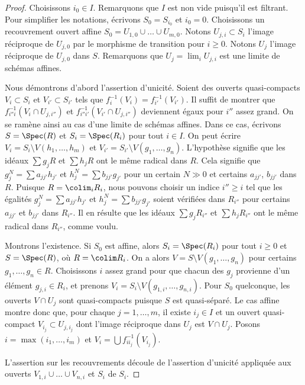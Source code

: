 \begin{proof}
Choisissons $i_0 \in I$. Remarquons que $I$ est non vide puisqu'il est
filtrant. Pour simplifier les notations, écrivons $S_0 = S_{i_0}$ et
$i_0 = 0$. Choisissons un recouvrement ouvert affine
$S_0 = U_{1, 0} \cup \ldots \cup U_{m, 0}$. Notons
$U_{j, i} \subset S_i$ l'image réciproque de $U_{j, 0}$ par le morphisme de
transition pour $i \geq 0$. Notons $U_j$ l'image réciproque de $U_{j, 0}$ dans $S$.
Remarquons que $U_j = \lim_i U_{j, i}$ est une limite de schémas affines.

\medskip\noindent
Nous démontrons d'abord l'assertion d'unicité. Soient des ouverts
quasi-compacts $V_i \subset S_i$ et $V_{i'} \subset S_{i'}$ tels que
$f_i^{-1}(V_i) = f_{i'}^{-1}(V_{i'})$. Il suffit de montrer que
$f_{i''i}^{-1}(V_i \cap U_{j, i''})$ et
$f_{i''i'}^{-1}(V_{i'} \cap U_{j, i''})$ deviennent égaux pour $i''$ assez
grand. On se ramène ainsi au cas d'une limite de schémas affines. Dans ce
cas, écrivons $S = \Spec(R)$ et $S_i = \Spec(R_i)$ pour tout $i \in I$.
On peut écrire $V_i = S_i \setminus V(h_1, \ldots, h_m)$ et
$V_{i'} = S_{i'} \setminus V(g_1, \ldots, g_n)$. L'hypothèse signifie que
les idéaux $\sum g_jR$ et $\sum h_jR$ ont le même radical dans $R$.
Cela signifie que $g_j^N = \sum a_{jj'}h_{j'}$ et
$h_j^N = \sum b_{jj'} g_{j'}$ pour un certain $N \gg 0$ et certains
$a_{jj'}$, $b_{jj'}$ dans $R$. Puisque $R = \colim_i R_i$, nous pouvons
choisir un indice $i'' \geq i$ tel que les égalités
$g_j^N = \sum a_{jj'}h_{j'}$ et
$h_j^N = \sum b_{jj'} g_{j'}$ soient vérifiées dans $R_{i''}$ pour certains
$a_{jj'}$ et $b_{jj'}$ dans $R_{i''}$. Il en résulte que les idéaux
$\sum g_jR_{i''}$ et $\sum h_jR_{i''}$ ont le même radical dans $R_{i''}$,
comme voulu.

\medskip\noindent
Montrons l'existence. Si $S_0$ est affine, alors
$S_i = \Spec(R_i)$ pour tout $i \geq 0$ et $S = \Spec(R)$, où
$R = \colim R_i$. On a alors
$V = S \setminus V(g_1, \ldots, g_n)$ pour certains
$g_1, \ldots, g_n \in R$. Choisissons $i$ assez grand pour que chacun des
$g_j$ provienne d'un élément $g_{j, i} \in R_i$, et prenons
$V_i = S_i \setminus V(g_{1, i}, \ldots, g_{n, i})$. Pour $S_0$ quelconque,
les ouverts $V \cap U_j$ sont quasi-compacts puisque $S$ est quasi-séparé.
Le cas affine montre donc que, pour chaque $j = 1, \ldots, m$, il existe
$i_j \in I$ et un ouvert quasi-compact $V_{i_j} \subset U_{j, i_j}$ dont
l'image réciproque dans $U_j$ est $V \cap U_j$. Posons
$i = \max(i_1, \ldots, i_m)$ et
$V_i = \bigcup f_{ii_j}^{-1}(V_{i_j})$.

\medskip\noindent
L'assertion sur les recouvrements découle de l'assertion d'unicité appliquée
aux ouverts $V_{1, i} \cup \ldots \cup V_{n, i}$ et $S_i$ de $S_i$.
\end{proof}

